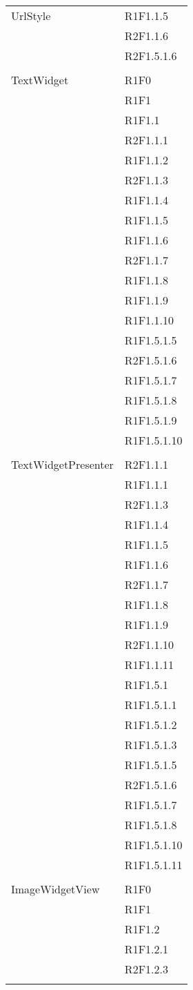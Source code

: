 \begin{center}
\begin{longtable}{|p{7cm}|p{7cm}|}
		UrlStyle & R1F1.1.5 \\ & R2F1.1.6 \\ & R2F1.5.1.6 \\ & \\ \hline
		TextWidget & R1F0 \\ & R1F1 \\ & R1F1.1 \\ & R2F1.1.1 \\ & R1F1.1.2 \\ & R2F1.1.3 \\ & R1F1.1.4 \\ & R1F1.1.5 \\ & R1F1.1.6 \\ & R2F1.1.7 \\ & R1F1.1.8 \\ & R1F1.1.9 \\ & R1F1.1.10 \\ & R1F1.5.1.5 \\ & R2F1.5.1.6 \\ & R1F1.5.1.7 \\ & R1F1.5.1.8 \\ & R1F1.5.1.9 \\ & R1F1.5.1.10 \\ & \\ \hline
		TextWidgetPresenter & R2F1.1.1 \\ & R1F1.1.1 \\ & R2F1.1.3 \\ & R1F1.1.4 \\ & R1F1.1.5 \\ & R1F1.1.6 \\ & R2F1.1.7 \\ & R1F1.1.8 \\ & R1F1.1.9 \\ & R2F1.1.10 \\ & R1F1.1.11 \\ & R1F1.5.1 \\ & R1F1.5.1.1 \\ & R1F1.5.1.2 \\ & R1F1.5.1.3 \\ & R1F1.5.1.5 \\ & R2F1.5.1.6 \\ & R1F1.5.1.7 \\ & R1F1.5.1.8 \\ & R1F1.5.1.10 \\ & R1F1.5.1.11 \\ & \\ \hline
		ImageWidgetView & R1F0 \\ & R1F1 \\ & R1F1.2 \\ & R1F1.2.1 \\ & R2F1.2.3 \\ & \\ \hline

\end{longtable}
\end{center}
